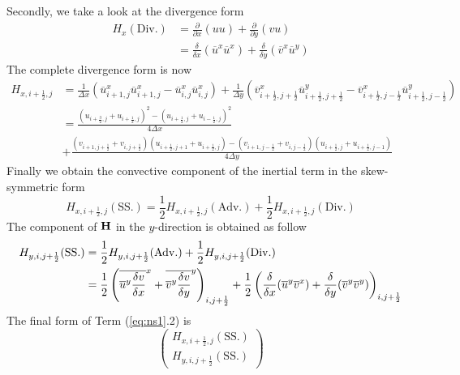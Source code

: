 \documentclass[a4paper,10pt]{scrartcl}
\begin{document}
Secondly, we take a look at the divergence form 
\begin{align}
	H_x(\mathrm{Div.}) &= \frac{\partial}{\partial x}(uu) + \frac{\partial}{\partial y}(vu) \\
		&= \frac{\delta}{\delta x}(\overline{u}^x\overline{u}^x) + \frac{\delta}{\delta y}(\overline{v}^x\overline{u}^y)
\end{align}
The complete divergence form is now
\begin{align}
	H_{x,i+\frac{1}{2},j} &= \frac{1}{\Delta x}\left(\overline{u}^x_{i+1,j}\overline{u}^x_{i+1,j} - \overline{u}^x_{i,j}\overline{u}^x_{i,j}\right) + \frac{1}{\Delta y}\left(\overline{v}^x_{i+\frac{1}{2},j+\frac{1}{2}}\overline{u}^y_{i+\frac{1}{2},j+\frac{1}{2}} - \overline{v}^x_{i+\frac{1}{2},j-\frac{1}{2}}\overline{u}^y_{i+\frac{1}{2},j-\frac{1}{2}}\right) \\
		&= \frac{(u_{i+\frac{3}{2},j}+u_{i+\frac{1}{2},j})^2-(u_{i+\frac{1}{2},j}+u_{i-\frac{1}{2},j})^2}{4\Delta x} \nonumber\\
		&+ \frac{(v_{i+1,j+\frac{1}{2}}+v_{i,j+\frac{1}{2}})(u_{i+\frac{1}{2},j+1}+u_{i+\frac{1}{2},j})-(v_{i+1,j-\frac{1}{2}}+v_{i,j-\frac{1}{2}})(u_{i+\frac{1}{2},j}+u_{i+\frac{1}{2},j-1})}{4\Delta y}
\end{align}	
Finally we obtain the convective component of the inertial term in the skew-symmetric form
\begin{equation}
	H_{x,i+\frac{1}{2},j}(\mathrm{SS.}) = \frac{1}{2}H_{x,i+\frac{1}{2},j}(\mathrm{Adv.}) + \frac{1}{2}H_{x,i+\frac{1}{2},j}(\mathrm{Div.})
\end{equation}
The component of $\vb{H}$ in the $y$-direction is obtained as follow
\begin{align}
	H_{y,i,j+\frac{1}{2}}(\mathrm{SS.}) &= \frac{1}{2}H_{y,i,j+\frac{1}{2}}(\mathrm{Adv.}) + \frac{1}{2}H_{y,i,j+\frac{1}{2}}(\mathrm{Div.}) \\
		&= \frac{1}{2}\left(\overline{\overline{u}^y\fdv{v}{x}}^x + \overline{\overline{v}^y\fdv{v}{y}}^y\right)_{i,j+\frac{1}{2}} + \frac{1}{2}\left(\frac{\delta}{\delta x}(\overline{u}^y\overline{v}^x) + \frac{\delta}{\delta y}(\overline{v}^y\overline{v}^y)\right)_{i,j+\frac{1}{2}}
\end{align}
The final form of Term (\ref{eq:ns1}.2) is
\begin{equation} \begin{pmatrix}H_{x,i+\frac{1}{2},j}(\mathrm{SS.}) \\ H_{y,i,j+\frac{1}{2}}(\mathrm{SS.})\end{pmatrix} \end{equation}
\end{document}
